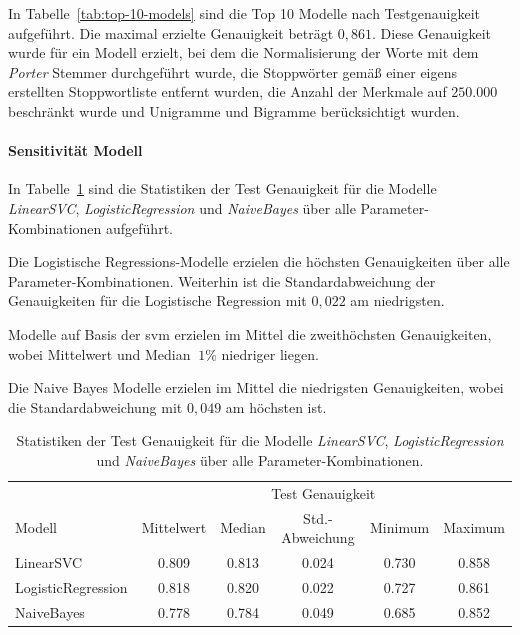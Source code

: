 In Tabelle~\ref{tab:top-10-models} sind die Top 10 Modelle nach Testgenauigkeit aufgeführt.
Die maximal erzielte Genauigkeit beträgt $0,861$.
Diese Genauigkeit wurde für ein Modell erzielt, bei dem die Normalisierung der Worte mit dem \textit{Porter} Stemmer durchgeführt wurde, die Stoppwörter gemäß einer eigens erstellten Stoppwortliste entfernt wurden, die Anzahl der Merkmale auf $250.000$ beschränkt wurde und Unigramme und Bigramme berücksichtigt wurden.

\paragraph{Sensitivität Modell}
In Tabelle~\ref{tab:stats-per-model} sind die Statistiken der Test Genauigkeit für die Modelle \textit{LinearSVC}, \textit{LogisticRegression} und \textit{NaiveBayes} über alle Parameter-Kombinationen aufgeführt.

Die Logistische Regressions-Modelle erzielen die höchsten Genauigkeiten über alle Parameter-Kombinationen.
Weiterhin ist die Standardabweichung der Genauigkeiten für die Logistische Regression mit $0,022$ am niedrigsten.

Modelle auf Basis der \gls{svm} erzielen im Mittel die zweithöchsten Genauigkeiten, wobei Mittelwert und Median $~1\%$ niedriger liegen.

Die Naive Bayes Modelle erzielen im Mittel die niedrigsten Genauigkeiten, wobei die Standardabweichung mit $0,049$ am höchsten ist.
\begin{table}
    \center

    \begin{tabular}{lccccc}
        \toprule
        & \multicolumn{5}{c}{Test Genauigkeit} \\
        Modell             & Mittelwert & Median & Std.-Abweichung & Minimum & Maximum \\
        \midrule
        LinearSVC          & 0.809      & 0.813  & 0.024           & 0.730   & 0.858   \\
        LogisticRegression & 0.818      & 0.820  & 0.022           & 0.727   & 0.861   \\
        NaiveBayes         & 0.778      & 0.784  & 0.049           & 0.685   & 0.852   \\
        \bottomrule
    \end{tabular}
    \caption{Statistiken der Test Genauigkeit für die Modelle \textit{LinearSVC}, \textit{LogisticRegression} und \textit{NaiveBayes} über alle Parameter-Kombinationen.}
    \label{tab:stats-per-model}
\end{table}

